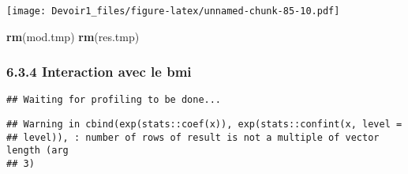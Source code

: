 \documentclass[]{article}
\newenvironment{Shaded}{\begin{snugshade}}{\end{snugshade}}
\newcommand{\KeywordTok}[1]{\textcolor[rgb]{0.13,0.29,0.53}{\textbf{#1}}}
\newcommand{\DataTypeTok}[1]{\textcolor[rgb]{0.13,0.29,0.53}{#1}}
\newcommand{\DecValTok}[1]{\textcolor[rgb]{0.00,0.00,0.81}{#1}}
\newcommand{\StringTok}[1]{\textcolor[rgb]{0.31,0.60,0.02}{#1}}
\newcommand{\OperatorTok}[1]{\textcolor[rgb]{0.81,0.36,0.00}{\textbf{#1}}}
\newcommand{\NormalTok}[1]{#1}
\begin{document}
\texttt{[image: Devoir1\_files/figure-latex/unnamed-chunk-85-10.pdf]}

\begin{Shaded}
\begin{Highlighting}[]
\KeywordTok{rm}\NormalTok{(mod.tmp)}
\KeywordTok{rm}\NormalTok{(res.tmp)}
\end{Highlighting}
\end{Shaded}

\subsubsection{6.3.4 Interaction avec le
bmi}\label{interaction-avec-le-bmi}

\begin{Shaded}
\end{Shaded}

\begin{verbatim}
## Waiting for profiling to be done...
\end{verbatim}

\begin{verbatim}
## Warning in cbind(exp(stats::coef(x)), exp(stats::confint(x, level =
## level)), : number of rows of result is not a multiple of vector length (arg
## 3)
\end{verbatim}
\end{document}
